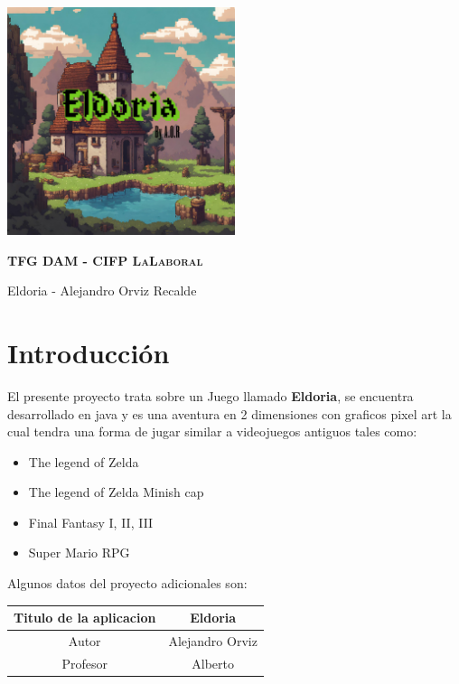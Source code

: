 \documentclass[a4paper]{article}
\begin{document}
	\begin{titlepage}
		\centering %
		\includegraphics[width=0.5\textwidth]{Images/Eldoria.png}\par
		\vspace{0.4cm}
		{\scshape\LARGE\textbf{TFG DAM - CIFP LaLaboral}\par} %
		\vspace{0.4cm}
		{\LARGE\textcolor{bluePortada}{Eldoria - Alejandro Orviz Recalde}\par}
	\end{titlepage}
    \clearpage
    \tableofcontents
    \clearpage

    \section{Introducción}
    El presente proyecto trata sobre un Juego llamado \textbf{Eldoria}, se encuentra desarrollado en java y es una aventura en 2 dimensiones con graficos pixel art
    la cual tendra una forma de jugar similar a videojuegos antiguos tales como:
    \begin{itemize}
        \item The legend of Zelda
        \item The legend of Zelda Minish cap 
        \item Final Fantasy I, II, III
        \item Super Mario RPG
    \end{itemize}
    Algunos datos del proyecto adicionales son:

\begin{center}
    \begin{tabular}{| c | c |}
        \hline
        Titulo de la aplicacion & Eldoria \\ \hline
        Autor & Alejandro Orviz \\ \hline
        Profesor & Alberto \\ \hline
    \end{tabular}
\end{center}
\end{document}
